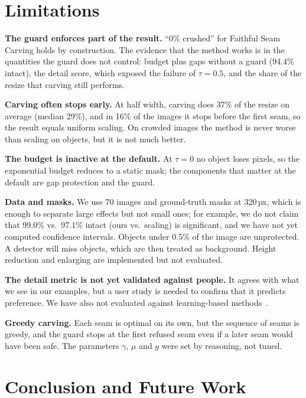 \documentclass[conference]{IEEEtran}
\newcommand{\ours}{Faithful Seam Carving}
\begin{document}
\section{Limitations}

\textbf{The guard enforces part of the result.} ``0\% crushed'' for \ours{} holds by construction. The evidence that the method works is in the quantities the guard does not control: budget plus gaps without a guard (94.4\% intact), the detail score, which exposed the failure of $\tau = 0.5$, and the share of the resize that carving still performs.

\textbf{Carving often stops early.} At half width, carving does 37\% of the resize on average (median 29\%), and in 16\% of the images it stops before the first seam, so the result equals uniform scaling. On crowded images the method is never worse than scaling on objects, but it is not much better.

\textbf{The budget is inactive at the default.} At $\tau = 0$ no object loses pixels, so the exponential budget reduces to a static mask; the components that matter at the default are gap protection and the guard.

\textbf{Data and masks.} We use 70 images and ground-truth masks at 320\,px, which is enough to separate large effects but not small ones; for example, we do not claim that 99.0\% vs.\ 97.1\% intact (ours vs.\ scaling) is significant, and we have not yet computed confidence intervals. Objects under 0.5\% of the image are unprotected. A detector will miss objects, which are then treated as background. Height reduction and enlarging are implemented but not evaluated.

\textbf{The detail metric is not yet validated against people.} It agrees with what we see in our examples, but a user study is needed to confirm that it predicts preference. We have also not evaluated against learning-based methods~\cite{shen2024prune,elsner2024deformation}.

\textbf{Greedy carving.} Each seam is optimal on its own, but the sequence of seams is greedy, and the guard stops at the first refused seam even if a later seam would have been safe. The parameters $\gamma$, $\mu$ and $g$ were set by reasoning, not tuned.

\section{Conclusion and Future Work}
\end{document}
